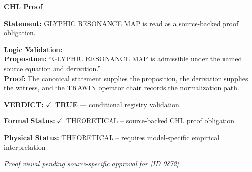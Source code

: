 \vspace{0.45em}
\noindent\textbf{CHL Proof}\par
\textbf{Statement:} GLYPHIC RESONANCE MAP is read as a source-backed proof obligation.

\textbf{Logic Validation:}\\
\textbf{Proposition:} ``GLYPHIC RESONANCE MAP is admissible under the named source equation and derivation.''\\
\textbf{Proof:} The canonical statement supplies the proposition, the derivation supplies the witness, and the TRAWIN operator chain records the normalization path.

\textbf{VERDICT:} \ensuremath{\checkmark}\ \textbf{TRUE} --- conditional registry validation

\textbf{Formal Status:} \ensuremath{\checkmark}\ THEORETICAL -- source-backed CHL proof obligation

\textbf{Physical Status:} THEORETICAL -- requires model-specific empirical interpretation
\par\vspace{0.45em}
\par
\vfill
\begingroup\footnotesize\itshape
Proof visual pending source-specific approval for [ID 0872].
\par\endgroup
\vfill
\endgroup
\endgroup
